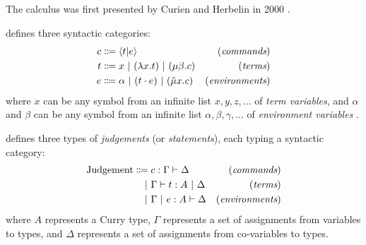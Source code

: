 \subsection{\texorpdfstring{\lbm{}}{Lambda bar mu}}
The calculus \lbm{} was first presented by Curien and Herbelin in 2000 \cite{curien-herbelin:2000}.
\begin{definition}
    \lbm{} defines three syntactic categories:
    \begin{align*}
        c &\Coloneqq \langle t | e \rangle &(\textit{commands}) \\
        t &\Coloneqq x \ |\  (\lambda x. t) \ |\  (\mu \beta. c) &(\textit{terms}) \\
        e &\Coloneqq \alpha \ |\  (t \cdot e) \ |\  (\tilde{\mu}x. c) &(\textit{environments})
    \end{align*}
    where $x$ can be any symbol from an infinite list $x, y, z, \ldots$ of \textit{term variables}, and $\alpha$ and $\beta$ can be any symbol from an infinite list $\alpha, \beta, \gamma, \ldots$ of \textit{environment variables} \cite{van-bakel:2024}.
\end{definition}
\begin{definition}
    \lbm{} defines three types of \textit{judgements} (or \textit{statements}), each typing a syntactic category:
    \begin{align*}
        \text{Judgement} \Coloneqq{} &c: \Gamma \vdash \Delta &(\textit{commands}) \\
        |\  &\Gamma \vdash t: A \ |\  \Delta &(\textit{terms}) \\
        |\  &\Gamma \ |\  e: A \vdash \Delta &(\textit{environments})
    \end{align*}
    where $A$ represents a Curry type, $\Gamma$ represents a set of assignments from variables to types, and $\Delta$ represents a set of assignments from co-variables to types.
\end{definition}
